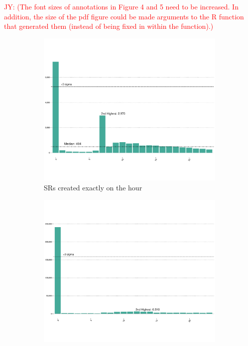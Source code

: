 \documentclass[linenumber]{jdsart}
\newcommand{\jy}[1]{\textcolor{red}{JY: (#1)}}
\begin{document}
\jy{The font sizes of annotations in Figure 4 and 5 need to be
  increased. In addition, the size of the pdf figure could be made
  arguments to the R function that generated them (instead of being
  fixed in within the function).}

\begin{figure}[tbp]
    \centering
    \begin{subfigure}[t]{0.495\textwidth} %
        \centering
        \includegraphics[width=\textwidth]{2-year-trend_SRs_created_on_the_hour.pdf}
        \caption{SRs created exactly on the hour}
        \label{fig:busiestcreated}
    \end{subfigure}
    \hfill %
    \begin{subfigure}[t]{0.495\textwidth} %
        \centering
        \includegraphics[width=\textwidth]{2-year-trend_SRs_closed_on_the_hour.pdf}

\end{subfigure}
\end{figure}
\end{document}
